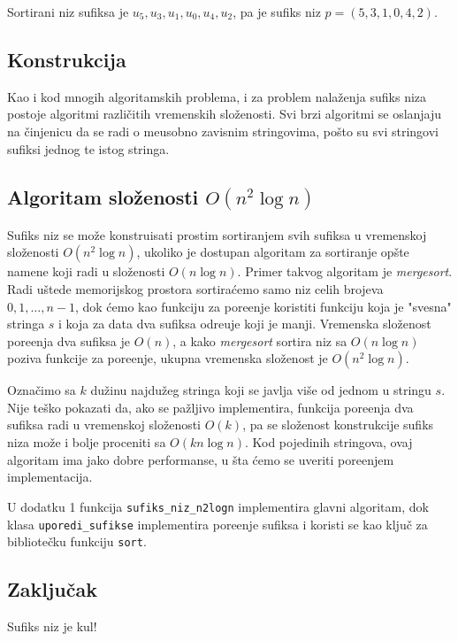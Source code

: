 Sortirani niz sufiksa je $u_5, u_3, u_1, u_0, u_4, u_2$, pa je sufiks niz $p = (5,3,1,0,4,2)$.

\subsection{Konstrukcija}

Kao i kod mnogih algoritamskih problema, i za problem nala\v zenja sufiks niza postoje algoritmi razli\v citih vremenskih slo\v zenosti. Svi brzi algoritmi se oslanjaju na \v cinjenicu da se radi o me\dj usobno zavisnim stringovima, po\v sto su svi stringovi sufiksi jednog te istog stringa.

\subsection{Algoritam slo\v zenosti $O(n^2 \log n)$}

Sufiks niz se mo\v ze konstruisati prostim sortiranjem svih sufiksa u vremenskoj slo\v zenosti $O(n^2 \log n)$, ukoliko je dostupan algoritam za sortiranje op\v ste namene koji radi u slo\v zenosti $O(n \log n)$. Primer takvog algoritam je \textit{mergesort}. Radi u\v stede memorijskog prostora sortira\' cemo samo niz celih brojeva $0,1,\ldots,n-1$, dok \' cemo kao funkciju za pore\dj enje koristiti funkciju koja je "svesna" stringa $s$ i koja za data dva sufiksa odre\dj uje koji je manji. Vremenska slo\v zenost pore\dj enja dva sufiksa je $O(n)$, a kako \textit{mergesort} sortira niz sa $O(n \log n)$ poziva funkcije za pore\dj enje, ukupna vremenska slo\v zenost je $O(n^2 \log n)$.

Ozna\v cimo sa $k$ du\v zinu najdu\v zeg stringa koji se javlja vi\v se od jednom u stringu $s$. Nije te\v sko pokazati da, ako se pa\v zljivo implementira, funkcija pore\dj enja dva sufiksa radi u vremenskoj slo\v zenosti $O(k)$, pa se slo\v zenost konstrukcije sufiks niza mo\v ze i bolje proceniti sa $O(kn \log n)$. Kod pojedinih stringova, ovaj algoritam ima jako dobre performanse, u \v sta \' cemo se uveriti pore\dj enjem implementacija.

U dodatku 1 funkcija \texttt{sufiks\_niz\_n2logn} implementira glavni algoritam, dok klasa \texttt{uporedi\_sufikse} implementira pore\dj enje sufiksa i koristi se kao klju\v c za bibliote\v cku funkciju \texttt{sort}.

\subsection{Zaklju\v cak}
Sufiks niz je kul!